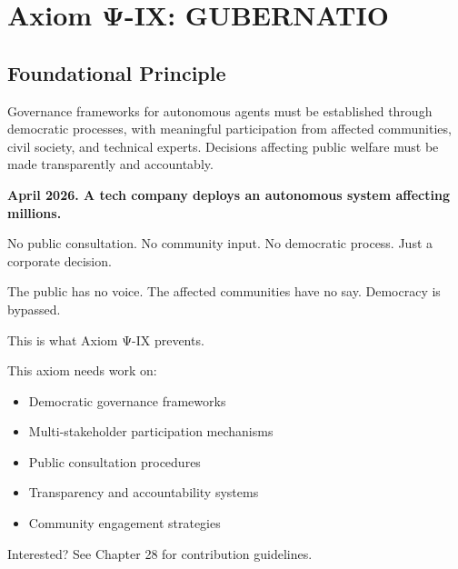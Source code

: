 
\chapter{Axiom Ψ-IX: GUBERNATIO}
\label{ch:axiom-IX}

\section*{Foundational Principle}

\begin{principlebox}
Governance frameworks for autonomous agents must be established through democratic processes, with meaningful participation from affected communities, civil society, and technical experts. Decisions affecting public welfare must be made transparently and accountably.
\end{principlebox}

\vspace{0.5cm}

\begin{tcolorbox}[colback=lightgray, colframe=legislativeblue, title=\textbf{📖 Why This Axiom Matters}]
\textbf{April 2026. A tech company deploys an autonomous system affecting millions.}

No public consultation. No community input. No democratic process. Just a corporate decision.

The public has no voice. The affected communities have no say. Democracy is bypassed.

This is what Axiom Ψ-IX prevents.
\end{tcolorbox}

\vspace{0.5cm}

\begin{tcolorbox}[colback=lightgray, colframe=accentgold, title=\textbf{🎯 Contribution Opportunity}]
This axiom needs work on:
\begin{itemize}
    \item Democratic governance frameworks
    \item Multi-stakeholder participation mechanisms
    \item Public consultation procedures
    \item Transparency and accountability systems
    \item Community engagement strategies
\end{itemize}

Interested? See Chapter 28 for contribution guidelines.
\end{tcolorbox}

